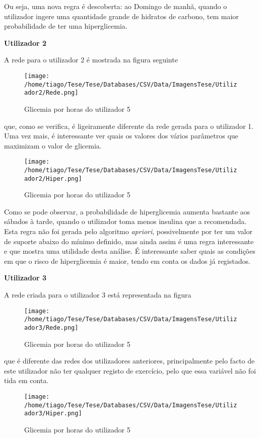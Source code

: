 Ou seja, uma nova regra é descoberta: ao Domingo de manhã, quando o utilizador ingere uma quantidade grande de hidratos de carbono, tem maior probabilidade de ter uma hiperglicemia. 

\textbf{Utilizador 2}


A rede para o utilizador 2 é mostrada na figura seguinte

\begin{figure}[H]
\centering
\texttt{[image: /home/tiago/Tese/Tese/Databases/CSV/Data/ImagensTese/Utilizador2/Rede.png]}
\caption{Glicemia por horas do utilizador 5}
\end{figure}

que, como se verifica, é ligeiramente diferente da rede gerada para o utilizador 1. Uma vez mais, é interessante ver quais os valores dos vários parâmetros que maximizam o valor de glicemia. 

\begin{figure}[H]
\centering
\texttt{[image: /home/tiago/Tese/Tese/Databases/CSV/Data/ImagensTese/Utilizador2/Hiper.png]}
\caption{Glicemia por horas do utilizador 5}
\end{figure}

Como se pode observar, a probabilidade de hiperglicemia aumenta bastante aos sábados à tarde, quando o utilizador toma menos insulina que a recomendada. Esta regra não foi gerada pelo algoritmo \textit{apriori}, possivelmente por ter um valor de suporte abaixo do mínimo definido, mas ainda assim é uma regra interessante e que mostra uma utilidade desta análise. É interessante saber quais as condições em que o risco de hiperglicemia é maior, tendo em conta os dados já registados. 

\textbf{Utilizador 3}

A rede criada para o utilizador 3 está representada na figura

\begin{figure}[H]
\centering
\texttt{[image: /home/tiago/Tese/Tese/Databases/CSV/Data/ImagensTese/Utilizador3/Rede.png]}
\caption{Glicemia por horas do utilizador 5}
\end{figure}

que é diferente das redes dos utilizadores anteriores, principalmente pelo facto de este utilizador não ter qualquer registo de exercício, pelo que essa variável não foi tida em conta.

\begin{figure}[H]
\centering
\texttt{[image: /home/tiago/Tese/Tese/Databases/CSV/Data/ImagensTese/Utilizador3/Hiper.png]}
\caption{Glicemia por horas do utilizador 5}
\end{figure}

